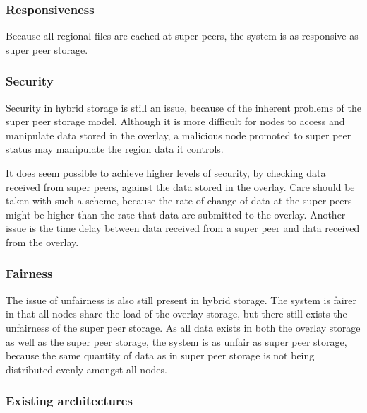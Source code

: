 \documentclass[10pt,a4paper,journal,cspaper,compsoc]{IEEEtran}
\begin{document}
\subsubsection{Responsiveness}

Because all regional files are cached at super peers, the system is as responsive as super peer storage.

\subsubsection{Security}

Security in hybrid storage is still an issue, because of the inherent problems of the super peer storage model. Although it is more difficult for
nodes to access and manipulate data stored in the overlay, a malicious node promoted to super peer status may manipulate the region data it controls.

It does seem possible to achieve higher levels of security, by checking data received from super peers, against the data stored in the overlay. Care
should be taken with such a scheme, because the rate of change of data at the super peers might be higher than the rate that data are submitted to
the overlay. Another issue is the time delay between data received from a super peer and data received from the overlay.

\subsubsection{Fairness}

The issue of unfairness is also still present in hybrid storage. The system is fairer in that all nodes share the load of the overlay storage, but
there still exists the unfairness of the super peer storage. As all data exists in both the overlay storage as well as the super peer storage, the
system is as unfair as super peer storage, because the same quantity of data as in super peer storage is not being distributed evenly amongst all
nodes.

\subsubsection{Existing architectures}
\end{document}
